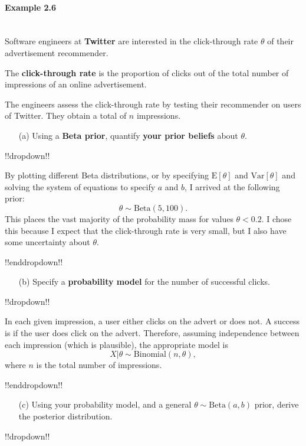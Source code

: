 \paragraph{Example 2.6}{~\\
Software engineers at \textbf{\color{darkblue}Twitter} are interested in the click-through rate $\theta$ of their advertisement recommender.

The \textbf{\color{darkblue}click-through rate} is the proportion of clicks out of the total number of impressions of an online advertisement.

The engineers assess the click-through rate by testing their recommender on users of Twitter. They obtain a total of $n$ impressions.

\begin{itemize}
\item [(a)] Using a \textbf{\color{darkblue}Beta prior}, quantify \textbf{\color{darkblue}your prior beliefs} about $\theta$.
\end{itemize}

!!dropdown!!

By plotting different Beta distributions, or by specifying $\text{E}[\theta]$ and $\text{Var}[\theta]$ and solving the system of equations to specify $a$ and $b$, I arrived at the following prior:
    $$ \theta \sim \mathrm{Beta}(5, 100). $$
    This places the vast majority of the probability mass for values $\theta < 0.2$. I chose this because I expect that the click-through rate is very small, but I also have some uncertainty about $\theta$.

!!enddropdown!!

\begin{itemize}
\item [(b)] Specify a \textbf{\color{darkblue}probability model} for the number of successful clicks.
\end{itemize}
!!dropdown!!

In each given impression, a user either clicks on the advert or does not. A success is if the user does click on the advert. Therefore, assuming independence between each impression (which is plausible), the appropriate model is
    $$ X|\theta \sim \mathrm{Binomial}(n, \theta), $$
    where $n$ is the total number of impressions.

!!enddropdown!!

\clearpage

\begin{itemize}
\item [(c)] Using your probability model, and a general $\theta \sim \mathrm{Beta}(a,b)$ prior, derive the posterior distribution.
\end{itemize}
!!dropdown!!

}
